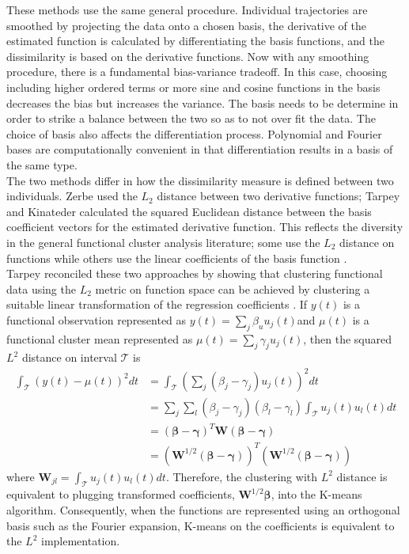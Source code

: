 \documentclass[12pt]{article}
\newcommand{\B}[0]{\mathbf}
\newcommand{\bs}[0]{\boldsymbol}
\begin{document}
These methods use the same general procedure. Individual trajectories are smoothed by projecting the data onto a chosen basis, the derivative of the estimated function is calculated by differentiating the basis functions, and the dissimilarity is based on the derivative functions. Now with any smoothing procedure, there is a fundamental bias-variance tradeoff. In this case, choosing including higher ordered terms or more sine and cosine functions in the basis decreases the bias but increases the variance. The basis needs to be determine in order to strike a balance between the two so as to not over fit the data. The choice of basis also affects the differentiation process. Polynomial and Fourier bases are computationally convenient in that differentiation results in a basis of the same type.\\

 The two methods differ in how the dissimilarity measure is defined between two individuals. Zerbe used the $L_{2}$ distance between two derivative functions; Tarpey and Kinateder calculated the squared Euclidean distance between the basis coefficient vectors for the estimated derivative function. This reflects the diversity in the general functional cluster analysis literature; some use the $L_{2}$ distance on functions \cite{hitchcock2007} while others use the linear coefficients of the basis function \cite{serban2005, tarpey2003, abraham2003}.\\
 
Tarpey reconciled these two approaches by showing that clustering functional data using the $L_{2}$ metric on function space can be achieved by clustering a suitable linear transformation of the regression coefficients \cite{tarpey2007}. If $y(t)$ is a functional observation represented as $y(t)=\sum_{j}\beta_{u}u_{j}(t)$and $\mu(t)$ is a functional cluster mean represented as $\mu(t) = \sum_{j}\gamma_{j}u_{j}(t)$, then the squared $L^{2}$ distance on interval $\mathcal{T}$ is
\begin{align*}
\int_{\mathcal{T}}(y(t)-\mu(t))^{2}dt &= \int_{\mathcal{T}}(\sum_{j}(\beta_{j}-\gamma_{j})u_{j}(t))^{2}dt\\
&= \sum_{j}\sum_{l}(\beta_{j}-\gamma_{j})(\beta_{l}-\gamma_{l}) \int_{\mathcal{T}}u_{j}(t)u_{l}(t)dt\\
&=(\bs\beta-\bs\gamma)^{T}\B W (\bs\beta-\bs\gamma)\\
&=(\B W^{1/2}(\bs\beta-\bs\gamma))^{T} (\B W^{1/2}(\bs\beta-\bs\gamma))
\end{align*}
where $\B W_{jl} = \int_{\mathcal{T}}u_{j}(t)u_{l}(t)dt$. Therefore, the clustering with $L^{2}$ distance is equivalent to plugging transformed coefficients, $\B W^{1/2}\bs\beta$, into the K-means algorithm. Consequently, when the functions are represented using an orthogonal basis such as the Fourier expansion, K-means on the coefficients is equivalent to the $L^{2}$ implementation.\\
\end{document}
